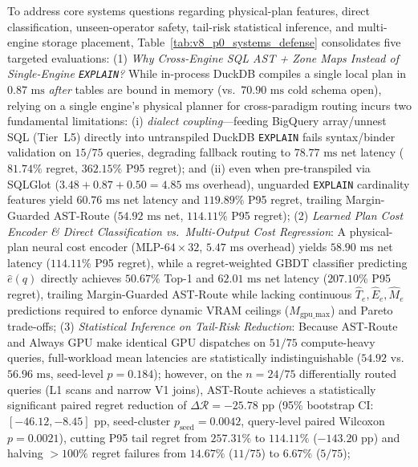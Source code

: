 \documentclass[10pt,a4paper]{article}
\begin{document}
To address core systems questions regarding physical-plan features, direct classification, unseen-operator safety, tail-risk statistical inference, and multi-engine storage placement, Table~\ref{tab:v8_p0_systems_defense} consolidates five targeted evaluations:
(1) \emph{Why Cross-Engine SQL AST + Zone Maps Instead of Single-Engine \texttt{EXPLAIN}?} While in-process DuckDB compiles a single local plan in $0.87\text{ ms}$ \emph{after} tables are bound in memory (vs.\ $70.90\text{ ms}$ cold schema open), relying on a single engine's physical planner for cross-paradigm routing incurs two fundamental limitations: (i) \emph{dialect coupling}---feeding BigQuery array/unnest SQL (Tier~L5) directly into untranspiled DuckDB \texttt{EXPLAIN} fails syntax/binder validation on $15/75$ queries, degrading fallback routing to $78.77\text{ ms}$ net latency ($81.74\%$ regret, $362.15\%$ P95 regret); and (ii) even when pre-transpiled via SQLGlot ($3.48 + 0.87 + 0.50 = 4.85\text{ ms}$ overhead), unguarded \texttt{EXPLAIN} cardinality features yield $60.76\text{ ms}$ net latency and $119.89\%$ P95 regret, trailing Margin-Guarded AST-Route ($54.92\text{ ms}$ net, $114.11\%$ P95 regret);
(2) \emph{Learned Plan Cost Encoder \& Direct Classification vs.\ Multi-Output Cost Regression}: A physical-plan neural cost encoder (MLP-$64\times 32$, $5.47\text{ ms}$ overhead) yields $58.90\text{ ms}$ net latency ($114.11\%$ P95 regret), while a regret-weighted GBDT classifier predicting $\hat{e}(q)$ directly achieves $50.67\%$ Top-1 and $62.01\text{ ms}$ net latency ($207.10\%$ P95 regret), trailing Margin-Guarded AST-Route while lacking continuous $\hat{T}_e,\hat{E}_e,\hat{M}_e$ predictions required to enforce dynamic VRAM ceilings ($M_{\text{gpu\_max}}$) and Pareto trade-offs;
(3) \emph{Statistical Inference on Tail-Risk Reduction}: Because AST-Route and Always GPU make identical GPU dispatches on $51/75$ compute-heavy queries, full-workload mean latencies are statistically indistinguishable ($54.92$ vs.\ $56.96\text{ ms}$, seed-level $p=0.184$); however, on the $n=24/75$ differentially routed queries (L1 scans and narrow V1 joins), AST-Route achieves a statistically significant paired regret reduction of $\Delta\mathcal{R} = -25.78\text{ pp}$ (95\% bootstrap CI: $[-46.12, -8.45]\text{ pp}$, seed-cluster $p_{\text{seed}}=0.0042$, query-level paired Wilcoxon $p=0.0021$), cutting P95 tail regret from $257.31\%$ to $114.11\%$ ($-143.20\text{ pp}$) and halving $>100\%$ regret failures from $14.67\%$ ($11/75$) to $6.67\%$ ($5/75$);
\end{document}
